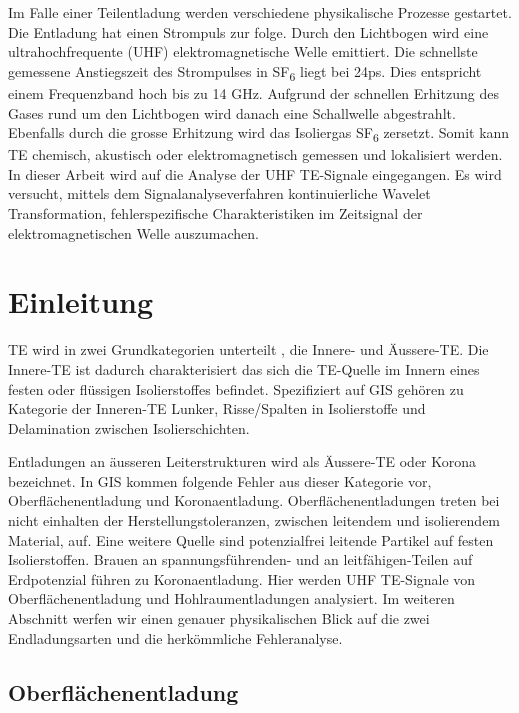 \begin{refsection}
Im Falle einer Teilentladung werden verschiedene  physikalische Prozesse gestartet. 
Die Entladung hat einen Strompuls zur folge.
Durch den Lichtbogen wird eine ultrahochfrequente (UHF) elektromagnetische Welle emittiert.
Die schnellste gemessene Anstiegszeit des Strompulses in SF\textsubscript{6} liegt bei 24ps.
Dies entspricht einem Frequenzband hoch bis zu 14 GHz. \cite{skript:Judd24ps} 
Aufgrund der schnellen Erhitzung des Gases rund um den Lichtbogen wird danach eine Schallwelle abgestrahlt. 
Ebenfalls durch die grosse Erhitzung wird das Isoliergas SF\textsubscript{6} zersetzt. 
Somit kann TE chemisch, akustisch oder elektromagnetisch gemessen und lokalisiert werden.\cite{skript:StatusReviewPDMeasurement}
In dieser Arbeit wird auf die Analyse der UHF TE-Signale eingegangen.
Es wird versucht, mittels dem Signalanalyseverfahren kontinuierliche Wavelet Transformation, fehlerspezifische Charakteristiken im Zeitsignal der elektromagnetischen Welle auszumachen.


\section{Einleitung}

TE wird in zwei Grundkategorien unterteilt \cite{buch:Kuchler}, die Innere- und Äussere-TE. 
Die Innere-TE ist dadurch charakterisiert das sich die TE-Quelle im Innern eines festen oder flüssigen Isolierstoffes befindet. 
Spezifiziert auf GIS gehören zu Kategorie der Inneren-TE Lunker, Risse/Spalten in Isolierstoffe und Delamination zwischen Isolierschichten.
 
Entladungen an äusseren Leiterstrukturen wird als Äussere-TE oder Korona bezeichnet. 
In GIS kommen folgende Fehler aus dieser Kategorie vor, Oberflächenentladung und Koronaentladung. 
Oberflächenentladungen treten bei nicht einhalten der Herstellungstoleranzen, zwischen leitendem und isolierendem Material, auf.
Eine weitere Quelle sind potenzialfrei leitende Partikel auf festen Isolierstoffen.
Brauen an spannungsführenden- und an leitfähigen-Teilen auf Erdpotenzial führen zu Koronaentladung. \cite{buch:Kuchler, skript:AeussreTE, skript:InnereTE}
Hier werden UHF TE-Signale von Oberflächenentladung und Hohlraumentladungen analysiert. 
Im weiteren Abschnitt werfen wir einen genauer physikalischen Blick auf die zwei Endladungsarten und die herkömmliche Fehleranalyse.

\subsection{Oberflächenentladung}


\end{refsection}
